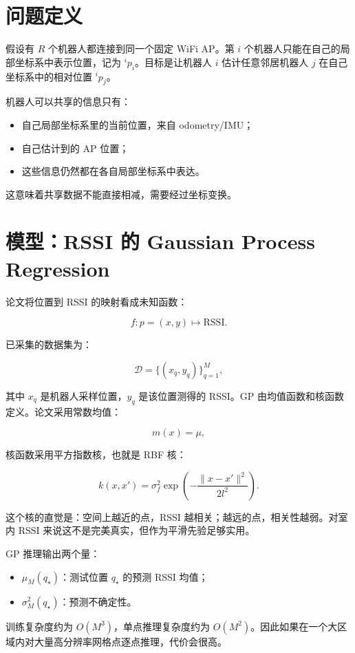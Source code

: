 \documentclass[UTF8,a4paper,12pt]{ctexrep}
\begin{document}
\section{问题定义}

假设有 \(R\) 个机器人都连接到同一个固定 WiFi AP。第 \(i\) 个机器人只能在自己的局部坐标系中表示位置，记为 \({}^{i}p_i\)。目标是让机器人 \(i\) 估计任意邻居机器人 \(j\) 在自己坐标系中的相对位置 \({}^{i}p_j\)。

机器人可以共享的信息只有：

\begin{itemize}
  \item 自己局部坐标系里的当前位置，来自 odometry/IMU；
  \item 自己估计到的 AP 位置；
  \item 这些信息仍然都在各自局部坐标系中表达。
\end{itemize}

这意味着共享数据不能直接相减，需要经过坐标变换。

\section{模型：RSSI 的 Gaussian Process Regression}

论文将位置到 RSSI 的映射看成未知函数：

\[
f: p=(x,y) \mapsto \mathrm{RSSI}.
\]

已采集的数据集为：

\[
\mathcal{D}=\{(x_q,y_q)\}_{q=1}^{M},
\]

其中 \(x_q\) 是机器人采样位置，\(y_q\) 是该位置测得的 RSSI。GP 由均值函数和核函数定义。论文采用常数均值：

\[
m(x)=\mu,
\]

核函数采用平方指数核，也就是 RBF 核：

\[
k(x,x')=\sigma_f^2 \exp\left(-\frac{\|x-x'\|^2}{2l^2}\right).
\]

这个核的直觉是：空间上越近的点，RSSI 越相关；越远的点，相关性越弱。对室内 RSSI 来说这不是完美真实，但作为平滑先验足够实用。

GP 推理输出两个量：

\begin{itemize}
  \item \(\mu_M(q_\star)\)：测试位置 \(q_\star\) 的预测 RSSI 均值；
  \item \(\sigma_M^2(q_\star)\)：预测不确定性。
\end{itemize}

训练复杂度约为 \(O(M^3)\)，单点推理复杂度约为 \(O(M^2)\)。因此如果在一个大区域内对大量高分辨率网格点逐点推理，代价会很高。
\end{document}
